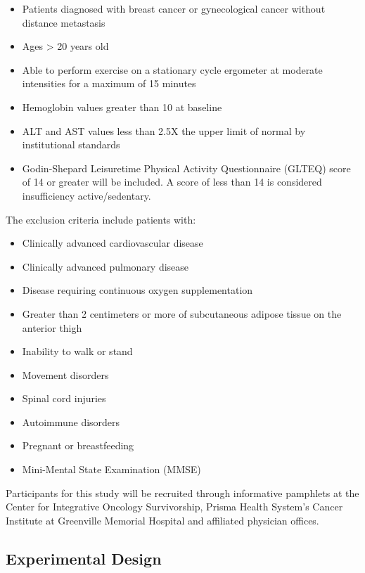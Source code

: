\documentclass[
]{book}
\providecommand{\tightlist}{%
  \setlength{\itemsep}{0pt}\setlength{\parskip}{0pt}}
\begin{document}
\begin{itemize}
\tightlist
\item
  Patients diagnosed with breast cancer or gynecological cancer without distance metastasis
\item
  Ages \textgreater{} 20 years old
\item
  Able to perform exercise on a stationary cycle ergometer at moderate intensities for a maximum of 15 minutes
\item
  Hemoglobin values greater than 10 at baseline
\item
  ALT and AST values less than 2.5X the upper limit of normal by institutional standards
\item
  Godin-Shepard Leisuretime Physical Activity Questionnaire (GLTEQ) score of 14 or greater will be included. A score of less than 14 is considered insufficiency active/sedentary.
\end{itemize}

The exclusion criteria include patients with:

\begin{itemize}
\tightlist
\item
  Clinically advanced cardiovascular disease
\item
  Clinically advanced pulmonary disease
\item
  Disease requiring continuous oxygen supplementation
\item
  Greater than 2 centimeters or more of subcutaneous adipose tissue on the anterior thigh
\item
  Inability to walk or stand
\item
  Movement disorders
\item
  Spinal cord injuries
\item
  Autoimmune disorders
\item
  Pregnant or breastfeeding
\item
  Mini-Mental State Examination (MMSE)
\end{itemize}

Participants for this study will be recruited through informative pamphlets at the Center for Integrative Oncology Survivorship, Prisma Health System's Cancer Institute at Greenville Memorial Hospital and affiliated physician offices.

\hypertarget{Appendix-IRB-Protocol-ExperimentalDesign}{%
\subsection{Experimental Design}\label{Appendix-IRB-Protocol-ExperimentalDesign}}
\end{document}
